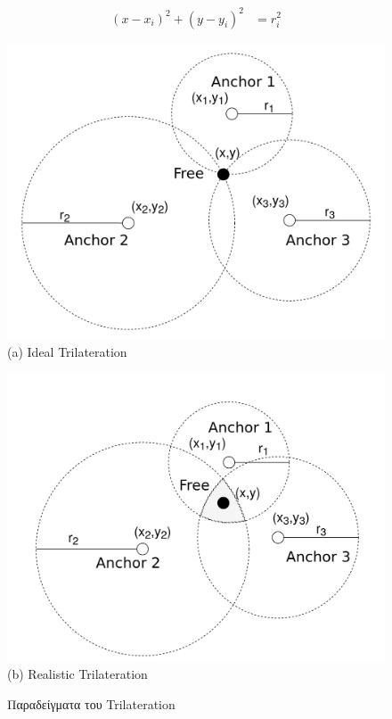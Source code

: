 \begin{align}
	(x-x_i)^2 + (y-y_i)^2 &= r_i^2 \label{eq:trilateration-circles}
\end{align}

\begin{figure} [H]
	\centering
		\begin{minipage}{.5\textwidth}
			\centering
			\includegraphics[width=0.7\linewidth]{../Photos/Trilateration-ideal.png}\\
			{(a) Ideal Trilateration}
		\end{minipage}%
		\begin{minipage}{.5\textwidth}
			\centering
			\includegraphics[width=.7\linewidth]{../Photos/Trilateration-actual.png}\\
			{(b) Realistic Trilateration}
		\end{minipage}
    \hfill \break
    \decoRule
    \caption[Παραδείγματα του Trilateration]{Παραδείγματα του Trilateration} %
    \label{fig:Trilateration-examples}
\end{figure}


